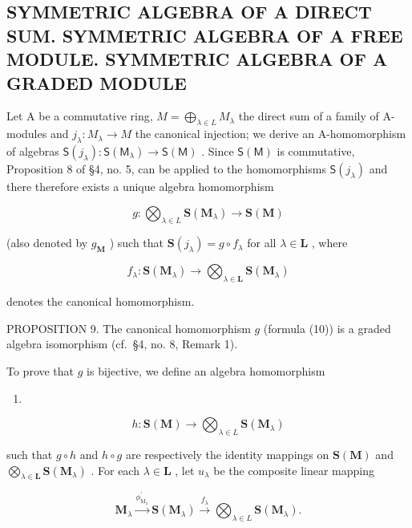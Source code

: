 \subsection{SYMMETRIC ALGEBRA OF A DIRECT SUM. SYMMETRIC ALGEBRA OF A FREE MODULE. SYMMETRIC ALGEBRA OF A GRADED MODULE}

Let A be a commutative ring, \(M = \bigoplus_{\lambda \in L} M_{\lambda}\) the direct sum of a family of A-modules and \(j_{\lambda}: M_{\lambda} \to M\) the canonical injection; we derive an A-homomorphism of algebras \(\mathsf{S}(j_{\lambda}): \mathsf{S}(\mathsf{M}_{\lambda}) \to \mathsf{S}(\mathsf{M})\) . Since \(\mathsf{S}(\mathsf{M})\) is commutative, Proposition 8 of §4, no. 5, can be applied to the homomorphisms \(\mathsf{S}(j_{\lambda})\) and there therefore exists a unique algebra homomorphism

\[
g \colon \bigotimes_ {\lambda \in L} \mathbf {S} (\mathbf {M} _ {\lambda}) \rightarrow \mathbf {S} (\mathbf {M})\tag{10}
\]

(also denoted by \(g_{\mathbf{M}}\) ) such that \(\mathbf{S}(j_{\lambda}) = g \circ f_{\lambda}\) for all \(\lambda \in \mathbf{L}\) , where

\[
f _ {\lambda} \colon \mathbf {S} (\mathbf {M} _ {\lambda}) \rightarrow \bigotimes_ {\lambda \in \mathbf {L}} \mathbf {S} (\mathbf {M} _ {\lambda})
\]

denotes the canonical homomorphism.

PROPOSITION 9. The canonical homomorphism \(g\) (formula (10)) is a graded algebra isomorphism (cf.~§4, no. 8, Remark 1).

To prove that \(g\) is bijective, we define an algebra homomorphism

\begin{enumerate}
\def\labelenumi{(\arabic{enumi})}
\setcounter{enumi}{10}
\tightlist
\item
\end{enumerate}

\[
h \colon \mathbf {S} (\mathbf {M}) \rightarrow \bigotimes_ {\lambda \in L} \mathbf {S} (\mathbf {M} _ {\lambda})
\]

such that \(g \circ h\) and \(h \circ g\) are respectively the identity mappings on \(\mathbf{S}(\mathbf{M})\) and \(\bigotimes_{\lambda \in \mathbf{L}} \mathbf{S}(\mathbf{M}_{\lambda})\) . For each \(\lambda \in \mathbf{L}\) , let \(u_{\lambda}\) be the composite linear mapping

\[
\mathbf {M} _ {\lambda} \xrightarrow {\phi_ {\mathrm{M} _ {\lambda}} ^ {\prime}} \mathbf {S} (\mathbf {M} _ {\lambda}) \xrightarrow {f _ {\lambda}} \bigotimes_ {\lambda \in L} \mathbf {S} (\mathbf {M} _ {\lambda}).
\]

